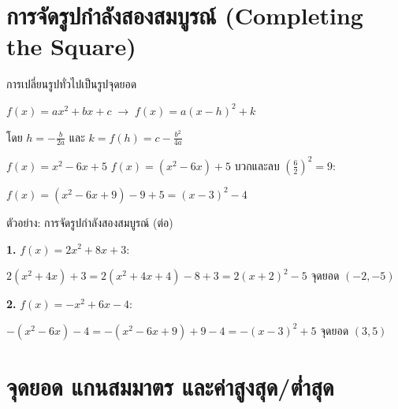 \documentclass[11pt, aspectratio=169]{beamer}
\begin{document}
\section{การจัดรูปกำลังสองสมบูรณ์ (Completing the Square)}

\begin{frame}{การเปลี่ยนรูปทั่วไปเป็นรูปจุดยอด}
  \begin{explanation}
    $f(x) = ax^2 + bx + c \;\longrightarrow\; f(x) = a(x-h)^2 + k$

    โดย $h = -\frac{b}{2a}$ และ $k = f(h) = c - \frac{b^2}{4a}$
  \end{explanation}

  \begin{exambox}[ตัวอย่าง]
    $f(x) = x^2 - 6x + 5$
    $f(x) = (x^2 - 6x) + 5$ \quad
    บวกและลบ $(\frac{6}{2})^2 = 9$:

    $f(x) = (x^2 - 6x + 9) - 9 + 5 = (x-3)^2 - 4$

  \end{exambox}
\end{frame}

\begin{frame}{ตัวอย่าง: การจัดรูปกำลังสองสมบูรณ์ (ต่อ)}
  \begin{exambox}[ตัวอย่าง]
    \textbf{1.} $f(x) = 2x^2 + 8x + 3$:

    $2(x^2+4x)+3 = 2(x^2+4x+4)-8+3 = 2(x+2)^2-5$ \quad จุดยอด $(-2,-5)$

    \textbf{2.} $f(x) = -x^2 + 6x - 4$:

    $-(x^2-6x)-4 = -(x^2-6x+9)+9-4 = -(x-3)^2+5$ \quad จุดยอด $(3,5)$
  \end{exambox}
\end{frame}

\section{จุดยอด แกนสมมาตร และค่าสูงสุด/ตํ่าสุด}
\end{document}
